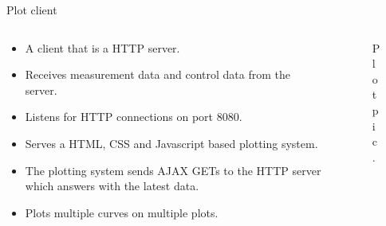 \documentclass{beamer}
\begin{document}
\begin{frame}{Plot client}
\begin{columns}[T]
    \begin{column}{.55\textwidth}
        \begin{itemize}
            \item A client that is a HTTP server.
            \item Receives measurement data and control data from the server.
            \item Listens for HTTP connections on port 8080.
            \item Serves a HTML, CSS and Javascript based plotting system.
            \item The plotting system sends AJAX GETs to the HTTP server which answers with the latest data.
            \item Plots multiple curves on multiple plots.
        \end{itemize}
    \end{column}
    \begin{column}{.45\textwidth}
        \begin{figure}[H]
           \centering
           	Plot pic.
        \end{figure}
    \end{column}
    \end{columns}
\end{frame}
\end{document}

